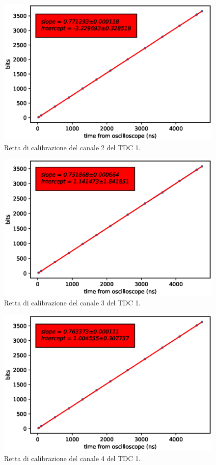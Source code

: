 \begin{figure}[H]
  \centering
  \includegraphics[width=.8\textwidth]{plots/tdc12.eps}
  \caption{Retta di calibrazione del canale 2 del TDC 1.}
  \label{fig:tdc12}
\end{figure}

\begin{figure}[H]
  \centering
  \includegraphics[width=.8\textwidth]{plots/tdc13.eps}
  \caption{Retta di calibrazione del canale 3 del TDC 1.}
  \label{fig:tdc13}
\end{figure}

\begin{figure}[H]
  \centering
  \includegraphics[width=.8\textwidth]{plots/tdc14.eps}
  \caption{Retta di calibrazione del canale 4 del TDC 1.}
  \label{fig:tdc14}
\end{figure}

